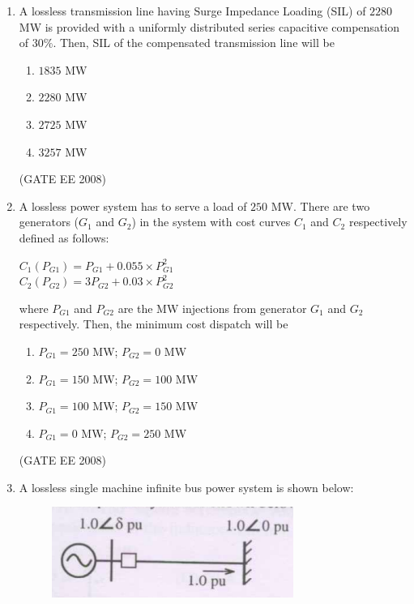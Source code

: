 \documentclass[journal,12pt,onecolumn]{IEEEtran}
\theoremstyle{remark}
\begin{document}
\begin{enumerate}[start=1, label=Q.\arabic*]
\item A lossless transmission line having Surge Impedance Loading (SIL) of $2280$ MW is provided with a uniformly distributed series capacitive compensation of $30 \%$. Then, SIL of the compensated transmission line will be

\begin{enumerate}
    \item $1835$ MW
    \item $2280$ MW
    \item $2725$ MW
    \item $3257$ MW
\end{enumerate}
\hfill (GATE EE 2008)


\item A lossless power system has to serve a load of $250$ MW. There are two generators ($G_1$ and $G_2$) in the system with cost curves $C_1$ and $C_2$ respectively defined as follows:
\begin{center}
$
C_1(P_{G1}) = P_{G1}+0.055 \times P_{G1}^2
$\\
$
C_2(P_{G2}) = 3P_{G2}+0.03 \times P_{G2}^2
$\\
\end{center}
where $P_{G1}$ and $P_{G2}$ are the MW injections from generator $G_1$ and $G_2$ respectively. Then, the minimum cost dispatch will be

\begin{multicols}{2}
\begin{enumerate}
    \item $P_{G1} = 250$ MW; $P_{G2} = 0$ MW
    \item $P_{G1} = 150$ MW; $P_{G2} = 100$ MW
    \item $P_{G1} = 100$ MW; $P_{G2} = 150$ MW
    \item $P_{G1} = 0$ MW; $P_{G2} = 250$ MW
\end{enumerate}
\end{multicols}
\hfill (GATE EE 2008)


\item A lossless single machine infinite bus power system is shown below:

\begin{figure}[H]
    \centering
    \includegraphics[width=\columnwidth]{Fig/q53.png}
    \caption{}
\end{figure}


\end{enumerate}
\end{document}
